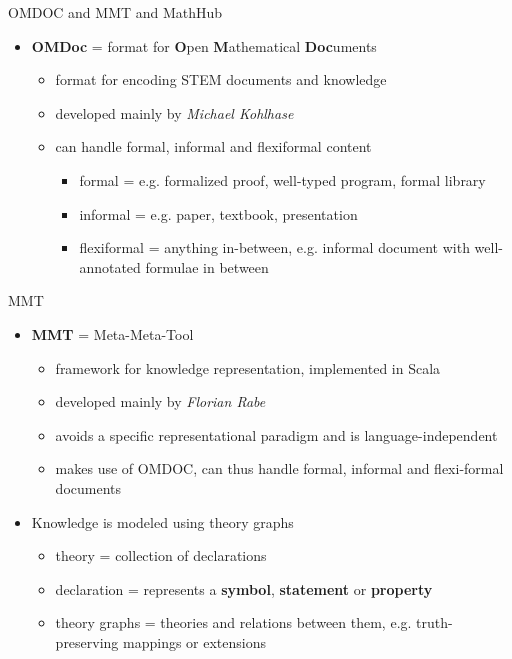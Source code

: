 \documentclass{beamer}
\begin{document}
    \begin{frame}{OMDOC and MMT and MathHub}
        \begin{itemize}
            \item \textbf{OMDoc} = format for \textbf{O}pen \textbf{M}athematical \textbf{Doc}uments
            \begin{itemize}
                \item format for encoding STEM documents and knowledge
                \item developed mainly by \textit{Michael Kohlhase}
                \item can handle formal, informal and flexiformal content
                \begin{itemize}
                    \item formal = e.g. formalized proof, well-typed program, formal library
                    \item informal = e.g. paper, textbook, presentation
                    \item flexiformal = anything in-between, e.g. informal document with well-annotated formulae in between
                \end{itemize}
            \end{itemize}
        \end{itemize}
    \end{frame}

    \begin{frame}[fragile]{MMT}
        \begin{itemize}
            \item \textbf{MMT} = Meta-Meta-Tool
            \begin{itemize}
                \item framework for knowledge representation, implemented in Scala
                \item developed mainly by \textit{Florian Rabe}
                \item avoids a specific representational paradigm and is language-independent
                \item makes use of OMDOC, can thus handle formal, informal and flexi-formal documents
            \end{itemize}
            \item Knowledge is modeled using theory graphs
            \begin{itemize}
                \item theory = collection of declarations 
                \item declaration = represents a \textbf{symbol}, \textbf{statement} or \textbf{property}
                \item theory graphs = theories and relations between them, e.g. truth-preserving mappings or extensions
            \end{itemize}
        \end{itemize}
        
    \end{frame}
\end{document}
